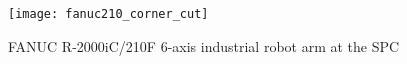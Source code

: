 \begin{figure}[H]
	\centering
	\texttt{[image: fanuc210\_corner\_cut]}
	\caption{FANUC R-2000iC/210F 6-axis industrial robot arm at the \ac{SPC}}
	\label{fig:fanuc210}
\end{figure}


	\cleardoublepage